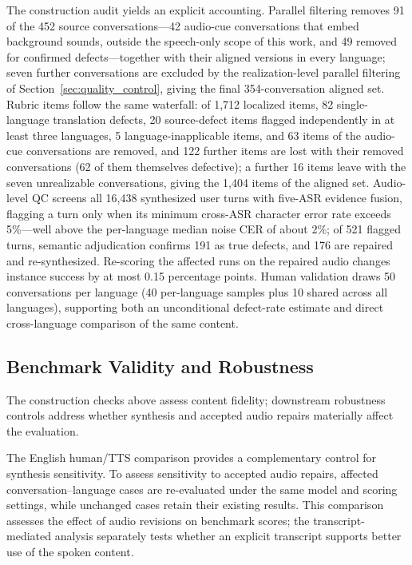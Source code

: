 \documentclass{article}
\begin{document}
The construction audit yields an explicit accounting. Parallel filtering removes 91 of the 452 source conversations---42 audio-cue conversations that embed background sounds, outside the speech-only scope of this work, and 49 removed for confirmed defects---together with their aligned versions in every language; seven further conversations are excluded by the realization-level parallel filtering of Section~\ref{sec:quality_control}, giving the final 354-conversation aligned set. Rubric items follow the same waterfall: of 1{,}712 localized items, 82 single-language translation defects, 20 source-defect items flagged independently in at least three languages, 5 language-inapplicable items, and 63 items of the audio-cue conversations are removed, and 122 further items are lost with their removed conversations (62 of them themselves defective); a further 16 items leave with the seven unrealizable conversations, giving the 1{,}404 items of the aligned set. Audio-level QC screens all 16{,}438 synthesized user turns with five-ASR evidence fusion, flagging a turn only when its minimum cross-ASR character error rate exceeds 5\%---well above the per-language median noise CER of about 2\%; of 521 flagged turns, semantic adjudication confirms 191 as true defects, and 176 are repaired and re-synthesized. Re-scoring the affected runs on the repaired audio changes instance success by at most 0.15 percentage points. Human validation draws 50 conversations per language (40 per-language samples plus 10 shared across all languages), supporting both an unconditional defect-rate estimate and direct cross-language comparison of the same content.

\subsection{Benchmark Validity and Robustness}
\label{sec:validity_results}

The construction checks above assess content fidelity; downstream robustness controls address whether synthesis and accepted audio repairs materially affect the evaluation.

The English human/TTS comparison provides a complementary control for synthesis sensitivity. To assess sensitivity to accepted audio repairs, affected conversation--language cases are re-evaluated under the same model and scoring settings, while unchanged cases retain their existing results. This comparison assesses the effect of audio revisions on benchmark scores; the transcript-mediated analysis separately tests whether an explicit transcript supports better use of the spoken content.
\end{document}
